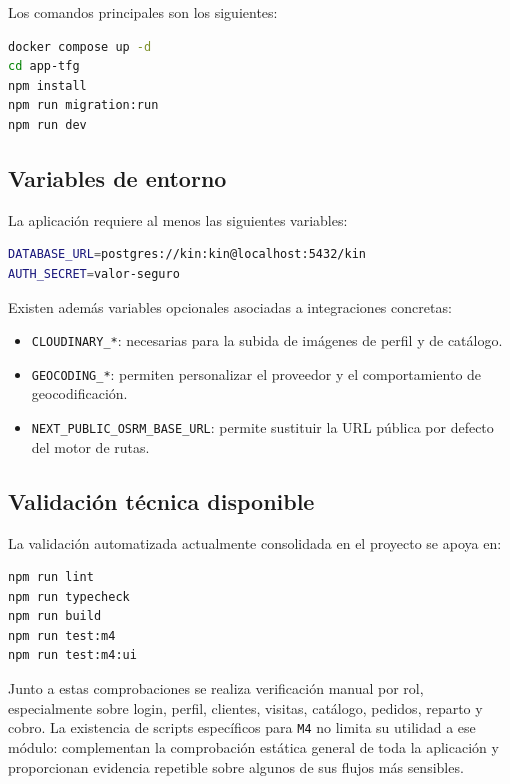 Los comandos principales son los siguientes:

\begin{lstlisting}[language=bash]
docker compose up -d
cd app-tfg
npm install
npm run migration:run
npm run dev
\end{lstlisting}

\subsection{Variables de entorno}

La aplicación requiere al menos las siguientes variables:

\begin{lstlisting}[language=bash]
DATABASE_URL=postgres://kin:kin@localhost:5432/kin
AUTH_SECRET=valor-seguro
\end{lstlisting}

Existen además variables opcionales asociadas a integraciones concretas:

\begin{itemize}
    \item \texttt{CLOUDINARY\_*}: necesarias para la subida de imágenes de perfil y de catálogo.
    \item \texttt{GEOCODING\_*}: permiten personalizar el proveedor y el comportamiento de geocodificación.
    \item \texttt{NEXT\_PUBLIC\_OSRM\_BASE\_URL}: permite sustituir la URL pública por defecto del motor de rutas.
\end{itemize}

\subsection{Validación técnica disponible}

La validación automatizada actualmente consolidada en el proyecto se apoya en:

\begin{lstlisting}[language=bash]
npm run lint
npm run typecheck
npm run build
npm run test:m4
npm run test:m4:ui
\end{lstlisting}

Junto a estas comprobaciones se realiza verificación manual por rol, especialmente sobre login, perfil, clientes, visitas, catálogo, pedidos, reparto y cobro. La existencia de scripts específicos para \texttt{M4} no limita su utilidad a ese módulo: complementan la comprobación estática general de toda la aplicación y proporcionan evidencia repetible sobre algunos de sus flujos más sensibles.
